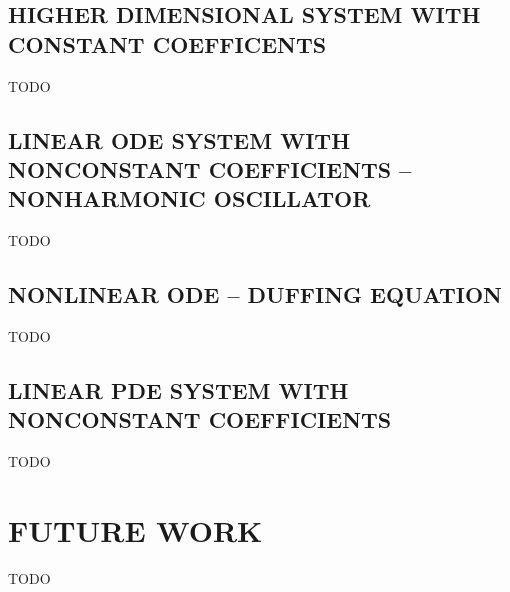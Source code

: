\documentclass[accepted]{uai2023}
\begin{document}
\subsection{HIGHER DIMENSIONAL SYSTEM WITH CONSTANT COEFFICENTS} \label{section:high-dimension}
    TODO

\subsection{LINEAR ODE SYSTEM WITH NONCONSTANT COEFFICIENTS -- NONHARMONIC OSCILLATOR} \label{section:experiment-nonharmonic-oscillator}
    TODO

\subsection{NONLINEAR ODE -- DUFFING EQUATION} \label{section:experiment-duffing}
    TODO

\subsection{LINEAR PDE SYSTEM WITH NONCONSTANT COEFFICIENTS } \label{section:experiment-attractor}
    TODO

\section{FUTURE WORK}
    TODO


\end{document}
